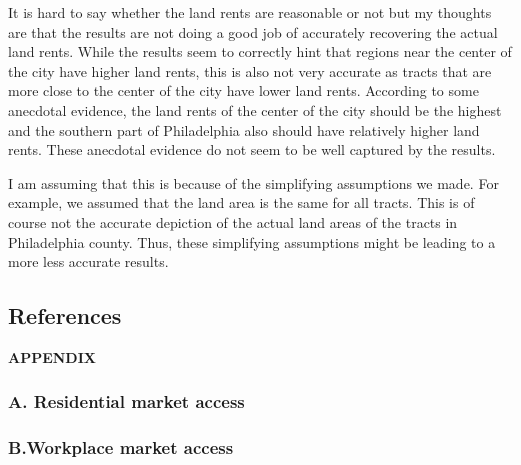 \documentclass[
  11pt]{article}
\begin{document}
\normalsize

It is hard to say whether the land rents are reasonable or not but my
thoughts are that the results are not doing a good job of accurately
recovering the actual land rents. While the results seem to correctly
hint that regions near the center of the city have higher land rents,
this is also not very accurate as tracts that are more close to the
center of the city have lower land rents. According to some anecdotal
evidence, the land rents of the center of the city should be the highest
and the southern part of Philadelphia also should have relatively higher
land rents. These anecdotal evidence do not seem to be well captured by
the results.

I am assuming that this is because of the simplifying assumptions we
made. For example, we assumed that the land area is the same for all
tracts. This is of course not the accurate depiction of the actual land
areas of the tracts in Philadelphia county. Thus, these simplifying
assumptions might be leading to a more less accurate results.

\clearpage

\subsection*{References}\label{references}

\renewcommand{\bibsection}{}


\clearpage

\label{appendix}
\bigskip

\begin{center}

{\large\bf APPENDIX}

\end{center}

\subsubsection*{A. Residential market
access}\label{a.-residential-market-access}



\clearpage

\subsubsection*{B.Workplace market
access}\label{b.workplace-market-access}


\end{document}
